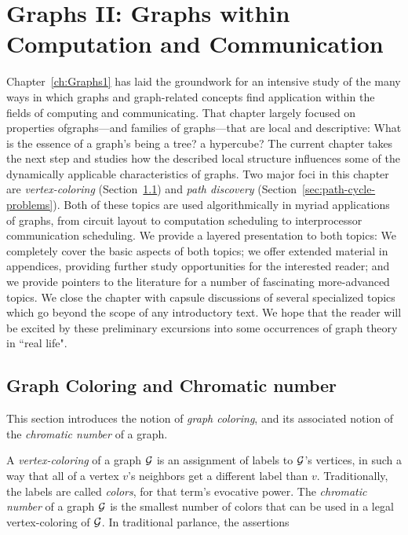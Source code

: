 
\chapter{Graphs II:
Graphs within Computation and Communication}
\label{ch:Graphs2}

Chapter~\ref{ch:Graphs1} has laid the groundwork for an intensive study of the many  ways in which graphs and graph-related concepts find application within the fields of computing and communicating.  That chapter largely focused on properties ofgraphs---and families of graphs---that are local and descriptive: What is the essence of a graph's being a tree? a hypercube?  The current chapter takes the next step and studies how the described local structure influences some of the dynamically applicable characteristics of graphs.  Two major foci in this chapter are {\em vertex-coloring} (Section~\ref{sec:graph-color}) and {\em path discovery} (Section~\ref{sec:path-cycle-problems}).  Both of these topics are used algorithmically in myriad applications of graphs, from circuit layout to computation scheduling to interprocessor communication scheduling.  We provide a layered presentation to both topics: We completely cover the basic aspects of both topics; we offer extended material in appendices, providing further study opportunities for the interested reader; and we provide pointers to the literature for a number of fascinating more-advanced topics.  We close the chapter with capsule discussions of several specialized topics which go beyond the scope of any introductory text.  We hope that the reader will be excited by these preliminary excursions into some occurrences of graph theory in ``real life".



\section{Graph Coloring and Chromatic number}
\label{sec:graph-color}

This section introduces the notion of {\it graph coloring}, and its
associated notion of the {\it chromatic number} of a graph.

A {\it vertex-coloring} of a graph $\mbox{$\cal G$}$ is an assignment of labels to $\mbox{$\cal G$}$'s vertices,  in such a way that all of a vertex $v$'s neighbors get a different label than $v$.  Traditionally, the labels are called {\it colors}, for that term's evocative power.  The {\it chromatic number} of a graph $\mbox{$\cal G$}$ is the smallest number of colors that can be used in a legal vertex-coloring of $\mbox{$\cal G$}$.  In traditional parlance, the assertions

